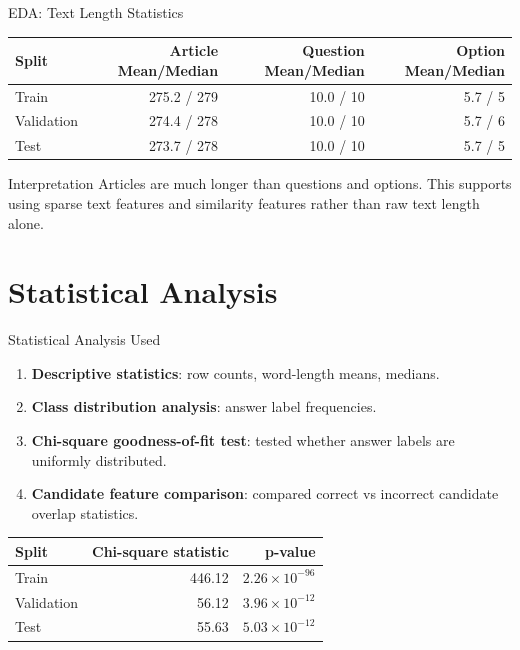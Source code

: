\documentclass[aspectratio=169,11pt]{beamer}
\begin{document}
\begin{frame}{EDA: Text Length Statistics}
    \begin{table}
        \centering
        \small
        \begin{tabular}{lrrr}
            \toprule
            \textbf{Split} & \textbf{Article Mean/Median} & \textbf{Question Mean/Median} & \textbf{Option Mean/Median} \\
            \midrule
            Train & 275.2 / 279 & 10.0 / 10 & 5.7 / 5 \\
            Validation & 274.4 / 278 & 10.0 / 10 & 5.7 / 6 \\
            Test & 273.7 / 278 & 10.0 / 10 & 5.7 / 5 \\
            \bottomrule
        \end{tabular}
    \end{table}

    \begin{block}{Interpretation}
        Articles are much longer than questions and options. This supports using
        sparse text features and similarity features rather than raw text length alone.
    \end{block}
\end{frame}

\section{Statistical Analysis}

\begin{frame}{Statistical Analysis Used}
    \begin{enumerate}
        \item \textbf{Descriptive statistics}: row counts, word-length means, medians.
        \item \textbf{Class distribution analysis}: answer label frequencies.
        \item \textbf{Chi-square goodness-of-fit test}: tested whether answer labels are uniformly distributed.
        \item \textbf{Candidate feature comparison}: compared correct vs incorrect candidate overlap statistics.
    \end{enumerate}

    \vspace{0.2cm}
    \begin{table}
        \centering
        \small
        \begin{tabular}{lrr}
            \toprule
            \textbf{Split} & \textbf{Chi-square statistic} & \textbf{p-value} \\
            \midrule
            Train & 446.12 & $2.26 \times 10^{-96}$ \\
            Validation & 56.12 & $3.96 \times 10^{-12}$ \\
            Test & 55.63 & $5.03 \times 10^{-12}$ \\
            \bottomrule
        \end{tabular}
    \end{table}
\end{frame}
\end{document}
